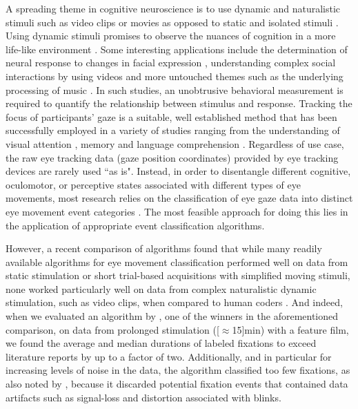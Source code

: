A spreading theme in cognitive neuroscience is to use dynamic and naturalistic
stimuli such as video clips or movies as opposed to static and isolated
stimuli \citep{real_world}. Using dynamic stimuli promises to observe
the nuances of cognition in a more life-like environment \citep{maguire2012studying}.
Some interesting applications include the determination of neural
response to changes in facial expression \citep{Harris2014}, understanding
complex social interactions by using videos \citep{Tikka2012} and more
untouched themes such as the underlying processing of music
\citep{Toiviainen2014}. In such studies, an unobtrusive behavioral measurement
is required to quantify the relationship between stimulus and response.
Tracking the focus of participants' gaze is a suitable, well established
method that has been successfully employed in a variety of studies ranging
from the understanding of visual attention \citep{HantaoLiu2011}, memory
\citep{Hannula2010} and language comprehension \citep{Gordon2006}.
%
Regardless of use case, the raw eye tracking data (gaze position coordinates)
provided by eye tracking devices are rarely used ``as is". Instead, in order
to disentangle different cognitive, oculomotor, or perceptive states
associated with different types of eye movements, most research relies on the
classification of eye gaze data into distinct eye movement event categories
\citep{Schutz2011}. The most feasible approach for doing this lies in the
application of appropriate event classification algorithms.

However, a recent comparison of algorithms found that while many readily
available algorithms for eye movement classification performed well on data
from static stimulation or short trial-based acquisitions with simplified
moving stimuli, none worked particularly well on data from complex naturalistic
dynamic stimulation, such as video clips, when compared to human coders
\citep{Andersson2017}.
%
And indeed, when we evaluated an algorithm by \citet{Nystrom2010AnData}, one of
the winners in the aforementioned comparison, on data from prolonged
stimulation (\unit[$\approx$15]{min}) with a feature film, we found the
average and median durations of labeled fixations to exceed literature
reports \citep[\eg][]{holmqvist2011eye,dorr2010variability} by up to a factor
of two. Additionally, and in particular for increasing levels of noise in the
data, the algorithm classified too few fixations, as also noted by
\citet{Friedman2018}, because it discarded potential fixation events that
contained data artifacts such as signal-loss and distortion associated with
blinks.
%

